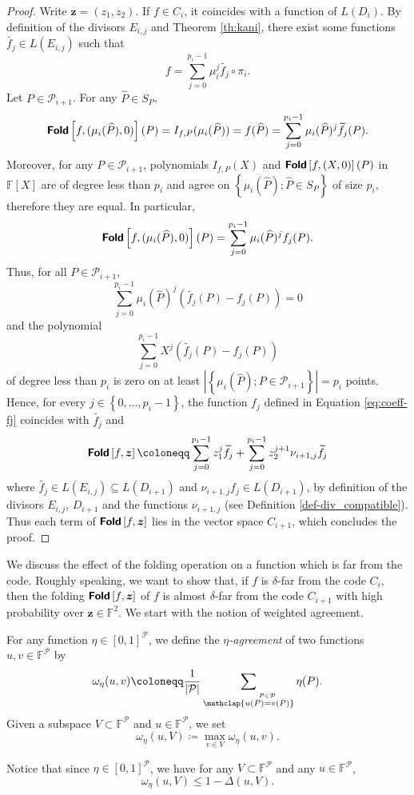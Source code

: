 \documentclass[10pt,a4paper]{article}
\renewcommand\hat{\widehat}
\newcommand\F{\mathbb{F}}
\newcommand\fold[1]{\textsf{\textbf{Fold}}\left[#1\right]}
\renewcommand{\hat}{\widehat}
\renewcommand{\vec}[1]{\boldsymbol{#1}}
\newcommand{\set}[1]{\left\{#1\right\}}
\newcommand{\size}[1]{\left|#1\right|}
\newcommand{\range}[1]{\set{0,\dots,#1-1}}
\newcommand\bfz{{\vec{z}}}
\newcommand\calP{\mathcal{P}}
\newcommand\mydef{\coloneqq}
\theoremstyle{plain}
\theoremstyle{plain}
\theoremstyle{definition}
\theoremstyle{remark}
\theoremstyle{plain}
\begin{document}
\begin{proof}
	Write $\bfz=(z_1,z_2)$. If $f \in C_i$, it coincides with a function of $L(D_{i})$. By definition of the divisors $E_{i,j}$ and Theorem \ref{th:kani}, there exist some functions $\widetilde{f_j} \in L(E_{i,j})$ such that
	\[ f= \sum_{j=0}^{p_i-1} \mu_i^j \widetilde{f_j} \circ \pi_i .\]
	Let $P \in \mathcal{P}_{i+1}$.    
	For any $\hat P \in S_P$,
	\[\fold{f,(\mu_i(\hat P),0)}(P) = I_{f, P}(\mu_i(\hat P)) = f(\hat P)=\sum_{j=0}^{p_i-1} \mu_i(\hat P)^j \widetilde{f_j}(P).\]
	Moreover, for any $P \in \calP_{i+1}$, polynomials $I_{f, P}(X)$ and $\fold{f, (X,0)}(P)$ in $\F[X]$ are of degree less than $p_i$ and agree on $\set{\mu_i(\hat P) ; \hat P \in S_P}$ of size $p_i$, therefore they are equal. In particular, 
	\[
	\fold{f, (\mu_i(\hat P),0)}(P) = \sum_{j = 0}^{p_i - 1} \mu_i(\hat P)^j f_j(P).
	\]
	Thus, for all $P \in \calP_{i+1}$, \[\sum_{j=0}^{p_i-1} \mu_i(\hat P)^j (\widetilde{f_j}(P) - f_j(P)) = 0\] and the polynomial \[\sum_{j=0}^{p_i-1} X^j (\widetilde{f_j}(P) - f_j(P))\] of degree less than $p_i$ is zero on at least $\size{\set{\mu_i(\hat P) ; P \in \calP_{i+ 1}}} = p_i$ points. Hence, for every ${j \in \range{p_i}}$, the function $f_j$ defined in Equation \eqref{eq:coeff-fj} coincides with $\widetilde{f_j}$ and
	\[\fold{f, \bfz} \mydef\sum_{j=0}^{p_i-1} z_1^j \widetilde{f_j} + \sum_{j=0}^{p_i-1} z_2^{j+1} \nu_{i+1,j} \widetilde{f_j}\]
	where $\widetilde{f_j} \in L(E_{i,j}) \subseteq L(D_{i+1})$ and $\nu_{i+1,j} f_j \in L(D_{i+1})$, by definition of the divisors $E_{i,j}$, $D_{i+1}$ and the functions $\nu_{i+1,j}$ (see Definition \ref{def-div_compatible}). Thus each term of $\fold{f,\bfz}$ lies in the vector space $C_{i+1}$, which concludes the proof.
\end{proof}

We discuss the effect of the folding operation on a function which is far from the code. Roughly speaking, we want to show that, if $f$ is $\delta$-far from the code $C_i$, then the folding $\fold{f, \bfz}$ of $f$ is almost $\delta$-far from the code $C_{i+1}$ with high probability over $\bfz \in \F^2$. We start with the notion of weighted agreement.

\begin{definition}\label{def:agreement}
	For any function $\eta \in [0,1]^{\calP}$, we define the \emph{$\eta$-agreement} of two functions $u,v \in \F^\calP$ by
	\[\omega_\eta(u,v) \mydef\frac{1}{|\calP|} \sum_{\mathclap{\stackrel{P \in \calP}{u(P) = v(P)}}} \eta(P).\]
	Given a subspace $V \subset \F^\calP$ and $u \in \F^\calP$, we set \[\omega_\eta(u,V) \mydef \max_{v \in V} \omega_\eta(u,v).\]
\end{definition}
Notice that since $\eta \in [0,1]^\calP$, we have for any $V \subset \F^\calP$ and any $u \in \F^\calP$,
\begin{equation}\label{eq:eta<1}
	\omega_\eta(u,V) \leq 1 - \Delta(u,V).
\end{equation}
\end{document}
